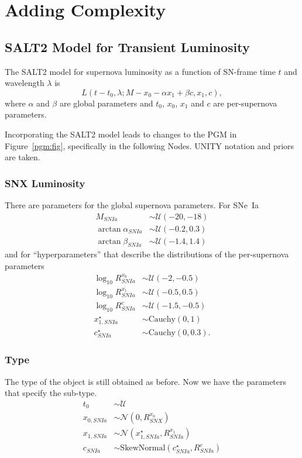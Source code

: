 \documentclass[preprint,3p]{elsarticle}
\begin{document}
\section{Adding Complexity}
\subsection{SALT2 Model for Transient Luminosity}
The SALT2 model for supernova luminosity as a function of SN-frame time $t$  and wavelength $\lambda$ is
\begin{equation}
L(t-t_0, \lambda; M-x_0-\alpha x_1 + \beta c, x_1, c),
\label{SALTL:eqn}
\end{equation}
where $\alpha$ and $\beta$ are global parameters and $t_0$, $x_0$, $x_1$ and $c$ are per-supernova parameters.

Incorporating the SALT2 model leads to changes to the PGM in Figure~\ref{pgm:fig}, specifically in the following Nodes.
UNITY notation and priors are taken.
\subsubsection{SNX Luminosity}
There are parameters for the global supernova parameters.  For SNe~Ia
\begin{align}
M_{SNIa} & \sim \mathcal{U}(-20, -18) \\
\arctan{\alpha_{SNIa}} & \sim \mathcal{U}(-0.2, 0.3) \\
\arctan{\beta_{SNIa}} & \sim \mathcal{U}(-1.4, 1.4)
\end{align}
and for ``hyperparameters'' that describe the distributions of the per-supernova parameters
\begin{align}
\log_{10}{R^{x_0}_{SNIa}} & \sim \mathcal{U}({-2}, {-0.5})\\
\log_{10}{R^{x_1}_{SNIa}} & \sim \mathcal{U}({-0.5}, {0.5})\\
\log_{10}{R^{c}_{SNIa}} & \sim \mathcal{U}({-1.5}, {-0.5})\\
x_{1,SNIa}^\star& \sim \text{Cauchy}(0,1)\\
c^\star_{SNIa} & \sim \text{Cauchy}(0,0.3).
\end{align}


\subsubsection{Type}
The type of the object is still obtained as before.  Now we have the parameters that specify the sub-type.
\begin{align}
t_0 & \sim \mathcal{U}\\
x_{0, SNIa} & \sim \mathcal{N}(0,R^{x_0}_{SNX})\\
x_{1,SNIa} & \sim \mathcal{N}(x_{1,SNIa}^\star,R^{x_1}_{SNIa})\\
c_{SNIa} & \sim \text{SkewNormal}(c^\star_{SNIa},R^{c}_{SNIa} )
\end{align}
\end{document}
